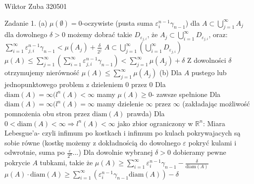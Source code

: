 \documentclass{article}
\begin{document}
 
Wiktor Zuba 320501
\newline

Zadanie 1.
\newline
\newline
(a)\newline
$\mu(\emptyset)=0$-oczywiste (pusta suma $\varepsilon_i^{n-1}\gamma_{n-1}$)\newline
dla $A\subset\bigcup\limits_{j=1}^{\infty}A_j$ dla dowolnego $\delta>0$ możemy dobrać takie $D_{\varepsilon_{j,i}}$,
że $A_j\subset\bigcup\limits_{i=1}^{\infty}D_{\varepsilon_{j,i}}$, oraz:\newline
$\sum\limits_{i=1}^{\infty}\varepsilon_{j,i}^{n-1}\gamma_{n-1}<\mu(A_j)+\frac{\delta}{2^j}$\newline
$A\subset\bigcup\limits_{j=1}^{\infty}\left(\bigcup\limits_{i=1}^{\infty}D_{\varepsilon_{j,i}}\right)$\quad
$\mu(A)\le\sum\limits_{j=1}^{\infty}\left(\sum\limits_{i=1}^{\infty}\varepsilon_{j,i}^{n-1}\gamma_{n-1}\right)<\sum\limits_{j=1}^{\infty}\mu(A_j)+\delta$\newline
Z dowolności $\delta$ otrzymujemy nierówność $\mu(A)\le\sum\limits_{j=1}^{\infty}\mu(A_j)$\newline\newline
(b)\newline
Dla $A$ pustego lub jednopunktowego problem z dzieleniem 0 przez 0\newline
Dla $\text{diam}(A)=\infty(l^{n}(A)<\infty$ mamy $\mu(A)\ge0$- zawsze spełnione\newline
Dla $\text{diam}(A)=\infty(l^{n}(A)=\infty$ mamy dzielenie $\infty$ przez $\infty$ (zakładając możliwość pomnożenia obu stron przez $\text{diam}(A)$ prawda)\newline
Dla $0<\text{diam}(A)<\infty\Rightarrow l^n(A)<\infty$ jako zbior ograniczony w $\mathbb{R}^n$:\newline
Miara Lebesgue'a- czyli infimum po kostkach i infimum po kulach pokrywajacych są sobie równe\newline
(kostkę możemy z dokładnością do dowolnego $\varepsilon$ pokryć kulami i odwrotnie, suma po $\frac{\varepsilon}{2^n}$...)\newline
Dla dowolnie wybranej $\delta>0$ dobieramy pewne pokrycie $A$ tubkami, takie że\newline
$\mu(A)\ge\sum\limits_{i=1}^{\infty}\varepsilon_{i}^{n-1}\gamma_{n-1}-\frac{\delta}{\text{diam}(A)}$\quad\quad\quad\quad
$\mu(A)\cdot\text{diam}(A)\ge\sum\limits_{i=1}^{\infty}(\varepsilon_{i}^{n-1}\gamma_{n-1}\text{diam}(A))-\delta$\newline
\end{document}
